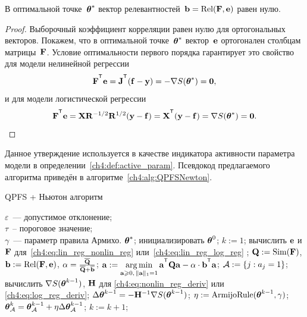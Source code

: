 \begin{statement}
	В оптимальной точке~$\boldsymbol{\theta}^*$ вектор релевантностей~$\mathbf{b} = \text{Rel} (\mathbf{F}, \mathbf{e})$ равен нулю.
\end{statement}
\begin{proof}
	Выборочный коэффициент корреляции равен нулю для ортогональных векторов.
	Покажем, что в оптимальной точке~$\boldsymbol{\theta}^*$ вектор~$\mathbf{e}$ ортогонален столбцам матрицы~$\mathbf{F}$. 
	Условие оптимальности первого порядка гарантирует это свойство для модели нелинейной регрессии
	\[
		\bF^{\T} \be = \bJ^{\T} (\mathbf{f} - \by) = - \nabla S(\btheta^*) = \boldsymbol{0},
	\]
	и для модели логистической регрессии
	\[
		\bF^{\T} \be = \bX \bR^{-1/2} \bR^{1/2} (\by - \mathbf{f}) = \bX^{\T} (\by - \mathbf{f}) = \nabla S(\btheta^*) = \boldsymbol{0}.
	\]
\end{proof}
Данное утверждение используется в качестве индикатора активности параметра модели в определении~\ref{ch4:def:active_param}.
Псевдокод предлагаемого алгоритма приведён в алгоритме~\ref{ch4:alg:QPFSNewton}.

\begin{algorithm}[ht]
	\caption{QPFS + Ньютон алгоритм}
	\label{ch4:alg:QPFSNewton}
	\begin{algorithmic}
		\REQUIRE $\varepsilon$~--- допустимое отклонение;\\
		\hspace{1.07cm}$\tau$~-- пороговое значение;\\
		\hspace{1.07cm}$\gamma$~--- параметр правила Армихо.
		\ENSURE $\boldsymbol{\theta}^*$;
		\STATE  инициализировать $\boldsymbol{\theta}^0$;
		\STATE $k := 1$;
		\REPEAT
		\STATE вычислить $\mathbf{e}$ и $\mathbf{F}$ для~\eqref{ch4:eq:lin_reg_nonlin_reg} или~\eqref{ch4:eq:lin_reg_log_reg} ;
		\vspace{0.1cm}
		\STATE $\mathbf{Q} := \text{Sim} (\mathbf{F})$, $\mathbf{b} := \text{Rel}(\mathbf{F}, \mathbf{e})$, $\alpha = \frac{\overline{\mathbf{Q}}}{\overline{\mathbf{Q}} + \overline{\mathbf{b}}}$;
		\vspace{0.1cm}
		\STATE $\ba := \argmin_{\ba \geq 0, \, \|\ba\|_1=1}\ba^{\T} \bQ \ba - \alpha \cdot \mathbf{b}^{\T} \ba$;
		\vspace{0.1cm}
		\STATE $\mathcal{A} := \{j: a_j = 1\}$;
		\vspace{0.1cm}
		\STATE вычислить $\nabla S(\boldsymbol{\theta}^{k-1})$, $\mathbf{H}$ для \eqref{ch4:eq:nonlin_reg_deriv} или \eqref{ch4:eq:log_reg_deriv};
		\vspace{0.1cm}
		\STATE $\Delta \boldsymbol{\theta}^{k-1} = - \mathbf{H}^{-1} \nabla S(\boldsymbol{\theta}^{k-1})$;
		\vspace{0.1cm}
		\STATE $\eta := \text{ArmijoRule}(\boldsymbol{\theta}^{k-1}, \gamma)$;
		\vspace{0.1cm}
		\STATE $\boldsymbol{\theta}_{\mathcal{A}}^k = \boldsymbol{\theta}_{\mathcal{A}}^{k - 1} + \eta \Delta \boldsymbol{\theta}_{\mathcal{A}}^{k - 1}$;
		\vspace{0.1cm}
		\STATE $k := k + 1$;
		\vspace{0.1cm}
	\end{algorithmic}
\end{algorithm}

